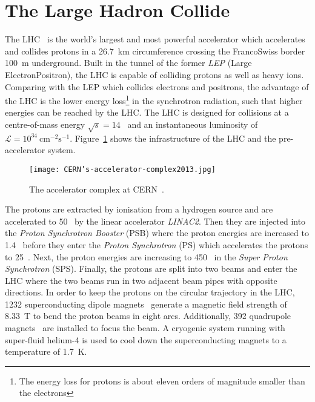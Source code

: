 \section{The Large Hadron Collide}
\label{sec:ae_LHC}
The LHC~\cite{1748-0221-3-08-S08001} is the world's largest and most powerful accelerator which accelerates and collides protons in a 26.7~km circumference crossing the Franco\textendash Swiss border 100~m underground.
Built in the tunnel of the former \textit{LEP} (Large Electron\textendash Positron), the LHC is capable of colliding protons as well as heavy ions.
Comparing with the LEP which collides electrons and positrons, the advantage of the LHC is the lower energy loss\footnote{The energy loss for protons is about eleven orders of magnitude smaller than the electrons} in the synchrotron radiation, such that higher energies can be reached by the LHC.
The LHC is designed for collisions at a centre-of-mass energy $\sqrt{s}=14$~{\TeV} and an instantaneous luminosity of $\mathcal{L} =10^{34}~\textrm{cm}^{-2}\textrm{s}^{-1}$.
Figure~\ref{fig:ae_CERN_accelerator_complex} shows the infrastructure of the LHC and the pre-accelerator system.

\begin{figure}[htbp]
\begin{center}
\texttt{[image: CERN's-accelerator-complex2013.jpg]}
\caption{The accelerator complex at CERN~\cite{Marcastel:1621583}.}
\label{fig:ae_CERN_accelerator_complex}
\end{center}
\end{figure}

The protons are extracted by ionisation from a hydrogen source and are accelerated to 50~{\MeV} by the linear accelerator \textit{LINAC2}.
Then they are injected into the \textit{Proton Synchrotron Booster} (PSB) where the proton energies are increased to 1.4~{\GeV} before they enter the \textit{Proton Synchrotron} (PS) which accelerates the protons to 25~{\GeV}.
Next, the proton energies are increasing to 450~{\GeV} in the \textit{Super Proton Synchrotron} (SPS). 
Finally, the protons are split into two beams and enter the LHC where the two beams run in two adjacent beam pipes with opposite directions.
In order to keep the protons on the circular trajectory in the LHC, 1232 superconducting dipole magnets~\cite{1288863} generate a magnetic field strength of 8.33~T to bend the proton beams in eight arcs.
Additionally, 392 quadrupole magnets~\cite{1288863} are installed to focus the beam.
A cryogenic system running with super-fluid helium-4 is used to cool down the superconducting magnets to a temperature of 1.7~K.

